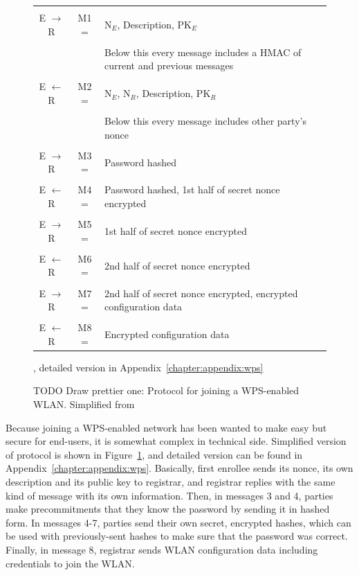 \documentclass[12pt,a4paper,oneside,pdftex]{report}
\begin{document}
\begin{figure}
\label{tab:wps}
\begin{tabular}{c|c p{10cm}}
    \hline \\

    E $\rightarrow$ R & M1 = & N$_E$, Description, PK$_E$ \\\\

    &  & Below this every message includes a HMAC of current and previous messages \\
    \hline \\

    E $\leftarrow$ R & M2 = & N$_E$, N$_R$, Description, PK$_R$ \\\\

    &  & Below this every message includes other party's nonce \\
    \hline \\

    E $\rightarrow$ R & M3 = & Password hashed \\\\

    E $\leftarrow$ R & M4 = & Password hashed, 1st half of secret nonce encrypted \\\\

    E $\rightarrow$ R & M5 = & 1st half of secret nonce encrypted \\\\

    E $\leftarrow$ R & M6 = & 2nd half of secret nonce encrypted \\\\

    E $\rightarrow$ R & M7 = & 2nd half of secret nonce encrypted, encrypted configuration data \\\\

    E $\leftarrow$ R & M8 = & Encrypted configuration data \\
    \hline
\end{tabular}
\caption{TODO Draw prettier one: Protocol for joining a WPS-enabled WLAN. Simplified from~\cite{microsoftWCN}}, detailed version in Appendix~\ref{chapter:appendix:wps}
\end{figure}

Because joining a WPS-enabled network has been wanted to make easy but secure for end-users, it is somewhat complex in technical side. Simplified version of protocol is shown in Figure~\ref{tab:wps}, and detailed version can be found in Appendix~\ref{chapter:appendix:wps}. Basically, first enrollee sends its nonce, its own description and its public key to registrar, and registrar replies with the same kind of message with its own information. Then, in messages 3 and 4, parties make precommitments that they know the password by sending it in hashed form. In messages 4-7, parties send their own secret, encrypted hashes, which can be used with previously-sent hashes to make sure that the password was correct. Finally, in message 8, registrar sends WLAN configuration data including credentials to join the WLAN.
\end{document}
